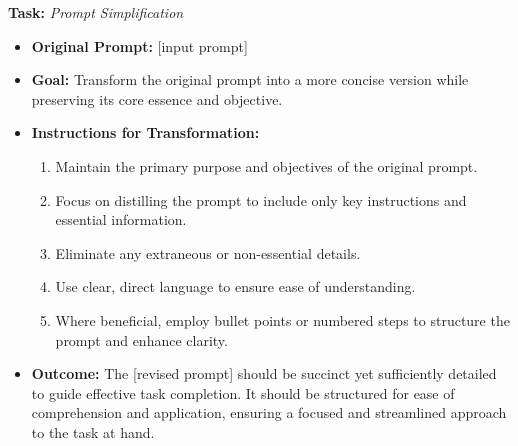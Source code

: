 \begin{tcolorbox}[width=0.95\textwidth,colback=gray!2!white,colframe=gray!50!blue]
    \begin{minipage}{\textwidth}
        \textbf{Task:} \textit{Prompt Simplification}
        \begin{itemize}
            \item \textbf{Original Prompt:} [input prompt]
            \item \textbf{Goal:} Transform the original prompt into a more concise version while preserving its core essence and objective.
            \item \textbf{Instructions for Transformation:}
                \begin{enumerate}
                    \item Maintain the primary purpose and objectives of the original prompt.
                    \item Focus on distilling the prompt to include only key instructions and essential information.
                    \item Eliminate any extraneous or non-essential details.
                    \item Use clear, direct language to ensure ease of understanding.
                    \item Where beneficial, employ bullet points or numbered steps to structure the prompt and enhance clarity.
                \end{enumerate}
            \item \textbf{Outcome:} The [revised prompt] should be succinct yet sufficiently detailed to guide effective task completion. It should be structured for ease of comprehension and application, ensuring a focused and streamlined approach to the task at hand.
        \end{itemize}
    \end{minipage}
\end{tcolorbox}
